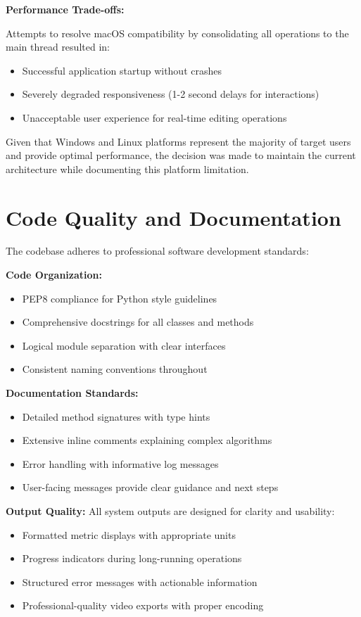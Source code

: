 \documentclass[11pt,a4paper]{article}
\begin{document}
\textbf{Performance Trade-offs:}

Attempts to resolve macOS compatibility by consolidating all operations to the main thread resulted in:
\begin{itemize}
\item Successful application startup without crashes
\item Severely degraded responsiveness (1-2 second delays for interactions)
\item Unacceptable user experience for real-time editing operations
\end{itemize}

Given that Windows and Linux platforms represent the majority of target users and provide optimal performance, the decision was made to maintain the current architecture while documenting this platform limitation.

\section{Code Quality and Documentation}

The codebase adheres to professional software development standards:

\textbf{Code Organization:}
\begin{itemize}
\item PEP8 compliance for Python style guidelines
\item Comprehensive docstrings for all classes and methods
\item Logical module separation with clear interfaces
\item Consistent naming conventions throughout
\end{itemize}

\textbf{Documentation Standards:}
\begin{itemize}
\item Detailed method signatures with type hints
\item Extensive inline comments explaining complex algorithms
\item Error handling with informative log messages
\item User-facing messages provide clear guidance and next steps
\end{itemize}

\textbf{Output Quality:}
All system outputs are designed for clarity and usability:
\begin{itemize}
\item Formatted metric displays with appropriate units
\item Progress indicators during long-running operations
\item Structured error messages with actionable information
\item Professional-quality video exports with proper encoding
\end{itemize}
\end{document}
